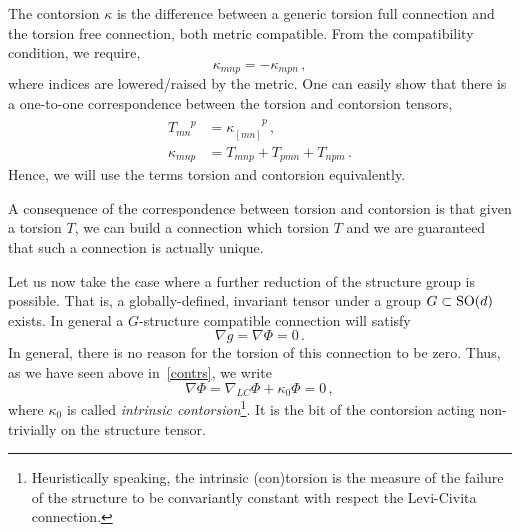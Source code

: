\documentclass[debug]{phd}
\begin{document}
						The contorsion $\kappa$ is the difference between a generic torsion full connection and the torsion free connection, both metric compatible.
						From the compatibility condition, we require,
								\begin{equation}
									\kappa_{mnp} = - \kappa_{mpn}\, ,
								\end{equation}
						where indices are lowered/raised by the metric.
						One can easily show that there is a one-to-one correspondence between the torsion and contorsion tensors,
								\begin{align*}
									T_{mn}^{\phantom{mn}p} &= \kappa_{[mn]}^{\phantom{[mn]}p}\, , \\
									\kappa_{mnp} &= T_{mnp} + T_{pmn} + T_{npm} \, .
								\end{align*}
						Hence, we will use the terms torsion and contorsion equivalently.
						
						A consequence of the correspondence between torsion and contorsion is that given a torsion $T$, we can build a connection which torsion $T$ and we are guaranteed that such a connection is actually unique.
						
						Let us now take the case where a further reduction of the structure group is possible. 
						That is, a globally-defined, invariant tensor under a group $G \subset \mathrm{SO}(d)$ exists.
						In general a $G$-structure compatible connection will satisfy
								\begin{equation}
									\nabla g = \nabla \Phi = 0\, .
								\end{equation}
						In general, there is no reason for the torsion of this connection to be zero.
						Thus, as we have seen above in~\eqref{contrs}, we write 
								\begin{equation}
									\nabla \Phi = \nabla_{LC} \Phi + \kappa_0 \Phi = 0\, ,
								\end{equation}
						where $\kappa_0$ is called \emph{intrinsic contorsion}\footnote{%
							Heuristically speaking, the intrinsic (con)torsion is the measure of the failure of the structure to be convariantly constant with respect the Levi-Civita connection.
							}.
						It is the bit of the contorsion acting non-trivially on the structure tensor.
						
\end{document}
